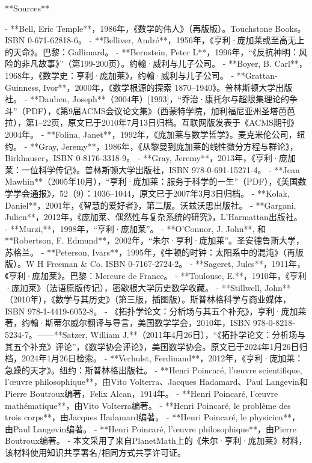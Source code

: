**Sources**

- **Bell, Eric Temple**，1986年，《数学的伟人》（再版版）。Touchstone Books。ISBN 0-671-62818-6。
- **Belliver, André**，1956年，《亨利·庞加莱或至高无上的天命》。巴黎：Gallimard。
- **Bernstein, Peter L**，1996年，“《反抗神明：风险的非凡故事》”（第199-200页）。约翰·威利与儿子公司。
- **Boyer, B. Carl**，1968年，《数学史：亨利·庞加莱》，约翰·威利与儿子公司。
- **Grattan-Guinness, Ivor**，2000年，《数学根源的探索 1870–1940》。普林斯顿大学出版社。
- **Dauben, Joseph**（2004年）[1993]，“乔治·康托尔与超限集理论的争斗”（PDF），《第9届ACMS会议论文集》（西蒙特学院，加利福尼亚州圣塔芭芭拉），第1–22页，原文已于2010年7月13日归档。互联网版发表于《ACMS期刊》2004年。
- **Folina, Janet**，1992年，《庞加莱与数学哲学》。麦克米伦公司，纽约。
- **Gray, Jeremy**，1986年，《从黎曼到庞加莱的线性微分方程与群论》，Birkhauser，ISBN 0-8176-3318-9。
- **Gray, Jeremy**，2013年，《亨利·庞加莱：一位科学传记》。普林斯顿大学出版社，ISBN 978-0-691-15271-4。
- **Jean Mawhin**（2005年10月），“亨利·庞加莱：服务于科学的一生”（PDF），《美国数学学会通报》，52（9）：1036–1044，原文已于2007年3月3日归档。
- **Kolak, Daniel**，2001年，《智慧的爱好者》，第二版。沃兹沃思出版社。
- **Gargani, Julien**，2012年，《庞加莱、偶然性与复杂系统的研究》，L'Harmattan出版社。
- **Murzi,**，1998年，“亨利·庞加莱”。
- **O'Connor, J. John**, 和 **Robertson, F. Edmund**，2002年，“朱尔·亨利·庞加莱”。圣安德鲁斯大学，苏格兰。
- **Peterson, Ivars**，1995年，《牛顿的时钟：太阳系中的混沌》（再版版）。W H Freeman & Co. ISBN 0-7167-2724-2。
- **Sageret, Jules**，1911年，《亨利·庞加莱》。巴黎：Mercure de France。
- **Toulouse, E.**，1910年，《亨利·庞加莱》（法语原版传记），密歇根大学历史数学收藏。
- **Stillwell, John**（2010年），《数学与其历史》（第三版，插图版）。斯普林格科学与商业媒体，ISBN 978-1-4419-6052-8。
- 《拓扑学论文：分析场与其五个补充》，亨利·庞加莱著，约翰·斯蒂尔威尔翻译与导言，美国数学学会，2010年，ISBN 978-0-8218-5234-7。——**Satzer, William J.**（2011年4月26日），“《拓扑学论文：分析场与其五个补充》评论”，《数学协会评论》，美国数学协会。原文已于2024年1月26日归档，2024年1月26日检索。
- **Verhulst, Ferdinand**，2012年，《亨利·庞加莱：急躁的天才》。纽约：斯普林格出版社。
- **Henri Poincaré, l'œuvre scientifique, l'œuvre philosophique**，由Vito Volterra、Jacques Hadamard、Paul Langevin和Pierre Boutroux编著，Felix Alcan，1914年。
- **Henri Poincaré, l'œuvre mathématique**，由Vito Volterra编著。
- **Henri Poincaré, le problème des trois corps**，由Jacques Hadamard编著。
- **Henri Poincaré, le physicien**，由Paul Langevin编著。
- **Henri Poincaré, l'œuvre philosophique**，由Pierre Boutroux编著。
- 本文采用了来自PlanetMath上的《朱尔·亨利·庞加莱》材料，该材料使用知识共享署名/相同方式共享许可证。